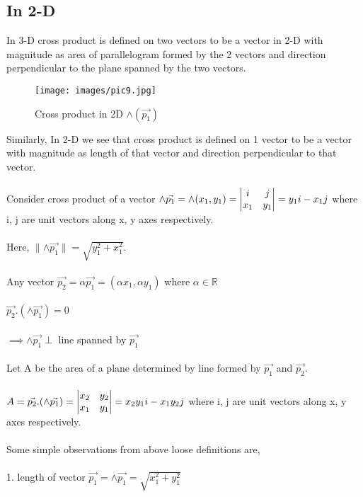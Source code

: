 \documentclass{article}
\begin{document}
    \subsection{In 2-D}
    In 3-D cross product is defined on two vectors to be a vector in 2-D with magnitude as area of parallelogram formed by the 2 vectors and direction perpendicular to the plane spanned by the two vectors. \\
    \begin{figure}[h]
    \caption{Cross product in 2D $\land (\Vec{p_1})$}
    \centering
    \texttt{[image: images/pic9.jpg]}
    \end{figure} 
    Similarly, In 2-D we see that cross product is defined on 1 vector to be a vector with magnitude as length of that vector and direction perpendicular to that vector. \\ \\
    Consider cross product of a vector $\land \Vec{p_1}=\land (x_1,y_1) = \mdet{i & j \\ x_1 & y_1 } = y_1 i - x_1j $ where i, j are unit vectors along x, y axes respectively. \\ \\
    Here, $\lVert \land \Vec{p_1} \rVert = \sqrt{y_1^2 + x_1^2}$. \\ \\
    Any vector $\Vec{p_2} = \alpha \Vec{p_1} = ( \alpha x_1, \alpha y_1)$ where $\alpha \in \mathbb{R}$ \\ \\
    $\Vec{p_2} . (\land \Vec{p_1}) = 0$ \\ \\
    $\implies \land \Vec{p_1} \perp$ line spanned by $\Vec{p_1}$ \\ \\
    Let A be the area of a plane determined by line formed by $\Vec{p_1}$ and $\Vec{p_2}$. \\ \\
    $A = \Vec{p_2} . (\land \Vec{p_1}) = \mdet{x_2 & y_2 \\ x_1 & y_1 } = x_2y_1 i - x_1y_2j $ where i, j are unit vectors along x, y axes respectively. \\ \\
    Some simple observations from above loose definitions are, \\ \\
    1. length of vector $ \Vec{p_1} = \land \Vec{p_1} = \sqrt{x_1^2 + y_1^2} $ \\ \\
\end{document}
